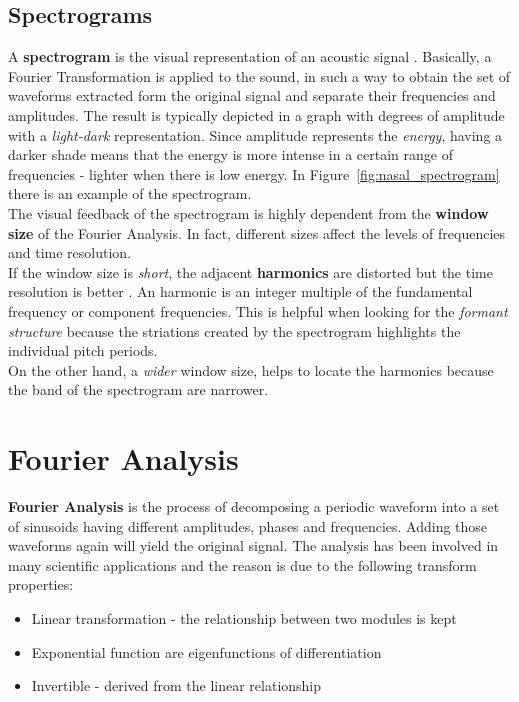 \subsection{Spectrograms}
\label{sec:spectrograms}
A \textbf{spectrogram} is the visual representation of an acoustic signal \cite{spectrogram_def}. Basically, a Fourier Transformation is applied to the sound, in such a way to obtain the set of waveforms extracted form the original signal and separate their frequencies and amplitudes. The result is typically depicted in a graph with degrees of amplitude with a \textit{light-dark} representation. Since amplitude represents the \textit{energy}, having a darker shade means that the energy is more intense in a certain range of frequencies - lighter when there is low energy. In Figure~\ref{fig:nasal_spectrogram} there is an example of the spectrogram. \\
\noindent The visual feedback of the spectrogram is highly dependent from the \textbf{window size} of the Fourier Analysis. In fact, different sizes affect the levels of frequencies and time resolution. \\
\noindent If the window size is \textit{short}, the adjacent \textbf{harmonics} are distorted but the time resolution is better \cite{spectrogram_def}. An harmonic is an integer multiple of the fundamental frequency or component frequencies. This is helpful when looking for the \textit{formant structure} because the striations created by the spectrogram highlights the individual pitch periods. \\
\noindent On the other hand, a \textit{wider} window size, helps to locate the harmonics because the band of the spectrogram are narrower.


\section{Fourier Analysis}
\label{sec:fourier_analysis}
\textbf{Fourier Analysis} is the process of decomposing a periodic waveform into a set of sinusoids having different amplitudes, phases and frequencies. Adding those waveforms again will yield the original signal. The analysis has been involved in many scientific applications and the reason is due to the following transform properties:

\begin{itemize}
	\item Linear transformation - the relationship between two modules is kept
	\item Exponential function are eigenfunctions of differentiation \cite{evans1997partial}
	\item Invertible - derived from the linear relationship
\end{itemize}

